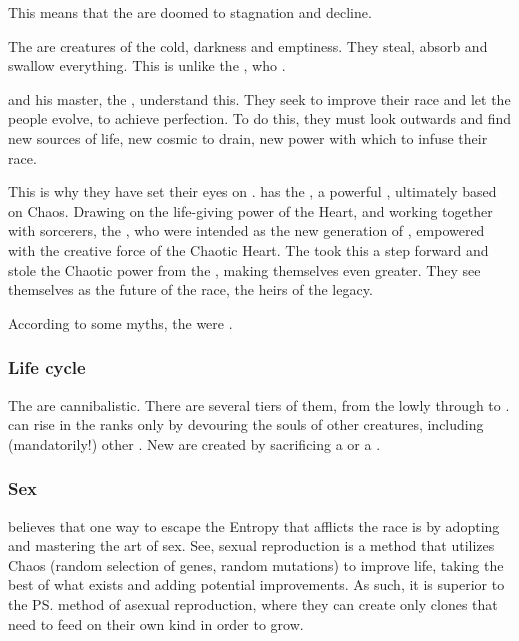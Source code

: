 This means that the \banes{} are doomed to stagnation and decline. 

The \banes{} are creatures of the cold, darkness and emptiness. 
They steal, absorb and swallow everything. 
This is unlike the \dragons, who . 

 and his master, the , understand this. 
They seek to improve their race and let the \bane{} people evolve, to achieve perfection. 
To do this, they must look outwards and find new sources of life, new cosmic \dweomers{} to drain, new power with which to infuse their race. 

This is why they have set their eyes on \Miith{}. 
\Miith{} has the , a powerful \dweomer{}, ultimately based on Chaos. 
Drawing on the life-giving power of the Heart, and working together with  sorcerers,  the , who were intended as the new generation of \banes, empowered with the creative force of the Chaotic Heart. 
The  took this a step forward and stole the Chaotic \xzaishannic{} power from the \dragons, making themselves even greater. They see themselves as the future of the \bane{} race, the heirs of the \bane{} legacy.

According to some myths, the \banes were .





\subsubsection{Life cycle}
The \banes are cannibalistic. 
There are several tiers of them, from the lowly \banespawn{} through \lesserbanes{} to \banelords. 
\Banes{} can rise in the ranks only by devouring the souls of other creatures, including (mandatorily!) other \banes. 
New \banespawn{} are created by sacrificing a \lesserbane{} or a \banelord. 







\subsubsection{Sex}
 believes that one way to escape the Entropy that afflicts the \bane{} race is by adopting and mastering the art of sex. See, sexual reproduction is a method that utilizes Chaos (random selection of genes, random mutations) to improve life, taking the best of what exists and adding potential improvements. As such, it is superior to the \ps{\banes}{} method of asexual reproduction, where they can create only clones that need to feed on their own kind in order to grow. 

